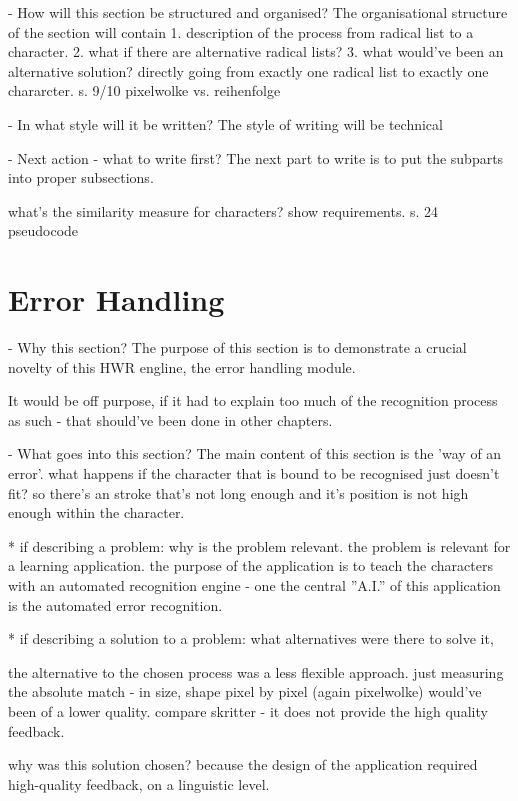- How will this section be structured and organised?
  The organisational structure of the section will contain
  1. description of the process from  radical list to a character.
  2. what if there are alternative radical lists?
  3. what would've been an alternative solution?
     directly going from exactly one radical list to exactly one chararcter.
     s. 9/10 pixelwolke vs. reihenfolge

- In what style will it be written?
  The style of writing will be technical

- Next action - what to write first?
  The next part to write is to put the subparts into proper subsections.

what's the similarity measure for
characters?
show requirements.
s. 24 pseudocode

\section{Error Handling}
\label{sec:hwre:errorhandling}

- Why this section? 
  The purpose of this section is to demonstrate a crucial novelty of this 
  HWR engline, the error handling module.
  
  It would be off purpose, if it had to explain too much of the recognition 
  process as such - that should've been done in other chapters.
  
- What goes into this section?
  The main content of this section is the 'way of an error'.
  what happens if the character that is bound to be recognised just doesn't fit?
  so there's an stroke that's not long enough and it's position is not
  high enough within the character.

  * if describing a problem: why is the problem relevant.
    the problem is relevant for a learning application.
    the purpose of the application is to teach the characters with an automated
    recognition engine - one the central ''A.I.'' of this application
    is the automated error recognition.

  * if describing a solution to a problem: 
    what alternatives were there to solve it, 
    
    the alternative to the chosen process was a less flexible approach.
    just measuring the absolute match - in size, shape pixel by pixel
    (again pixelwolke) would've been of a lower quality.
    compare skritter - it does not provide the high quality feedback.

    why was this solution chosen? 
    because the design of the application required high-quality feedback,
    on a linguistic level.
    
